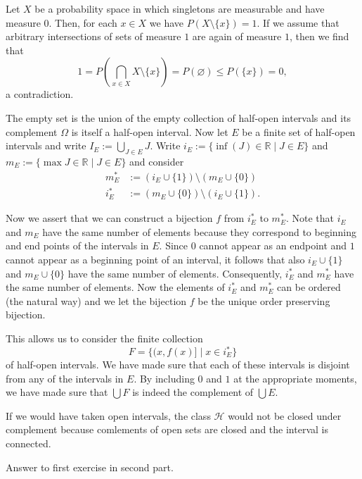 \documentclass{article}
\begin{document}
\begin{ex}
Let $X$ be a probability space in which singletons are measurable and have measure $0$. Then, for each $x\in X$ we have $P(X\setminus\{x\})=1$. If we assume that arbitrary intersections of sets of measure $1$ are again of measure $1$, then we find that
\begin{equation*}\textstyle
1=P(\bigcap_{x\in X}X\setminus\{x\})=P(\varnothing)\leq P(\{x\})=0,
\end{equation*}
a contradiction.
\end{ex}

\begin{ex}
The empty set is the union of the empty collection of half-open intervals and its complement $\Omega$ is itself a half-open interval. Now let $E$ be a finite set of half-open intervals and write $I_E:=\bigcup_{J\in E} J$. Write $i_E:=\{\inf(J)\in\mathbb{R}\mid J\in E\}$ and $m_E:=\{\max J\in\mathbb{R}\mid J\in E\}$ and consider 
\begin{align*}
m_E^\ast & :=(i_E\cup\{1\})\setminus (m_E\cup\{0\})\\
i_E^\ast & :=(m_E\cup\{0\})\setminus (i_E\cup\{1\}).
\end{align*} 

Now we assert that we can construct a bijection $f$ from $i_E^\ast$ to $m_E^\ast$. Note that $i_E$ and $m_E$ have the same number of elements because they correspond to beginning and end points of the intervals in $E$. Since $0$ cannot appear as an endpoint and $1$ cannot appear as a beginning point of an interval, it follows that also $i_E\cup\{1\}$ and $m_E\cup\{0\}$ have the same number of elements. Consequently, $i_E^\ast$ and $m_E^\ast$ have the same number of elements. Now the elements of $i_E^\ast$ and $m_E^\ast$ can be ordered (the natural way) and we let the bijection $f$ be the unique order preserving bijection.

This allows us to consider the finite collection
\begin{equation*}
F=\{(x,f(x)]\mid x\in i_E^\ast\}
\end{equation*}
of half-open intervals. We have made sure that each of these intervals is disjoint from any of the intervals in $E$. By including $0$ and $1$ at the appropriate moments, we have made sure that $\bigcup F$ is indeed the complement of $\bigcup E$.

If we would have taken open intervals, the class $\mathcal{H}$ would not be closed under complement because comlements of open sets are closed and the interval is connected.
\end{ex}

\begin{ex}

\end{ex}

\setcounter{ex}{0}

\begin{ex}
Answer to first exercise in second part.
\end{ex}
\end{document}
